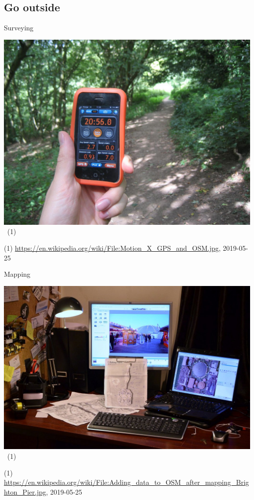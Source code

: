 \documentclass{beamer}
\begin{document}
	\subsection{Go outside}
	
	\begin{frame}{Surveying}
		\begin{center}
			\includegraphics[width=0.8\linewidth,height=0.8\textheight,keepaspectratio]{images/surveying}~\tiny{(1)}
		\end{center}
		{\tiny (1) \url{https://en.wikipedia.org/wiki/File:Motion\_X\_GPS\_and\_OSM.jpg}, 2019-05-25}
	\end{frame}

	\begin{frame}{Mapping}
		\begin{center}
			\includegraphics[width=0.8\linewidth,height=0.8\textheight,keepaspectratio]{images/mapping_outdoor}~\tiny{(1)}
		\end{center}
		{\tiny (1) \url{https://en.wikipedia.org/wiki/File:Adding\_data\_to\_OSM\_after\_mapping\_Brighton\_Pier.jpg}, 2019-05-25}
	\end{frame}
	
\end{document}
